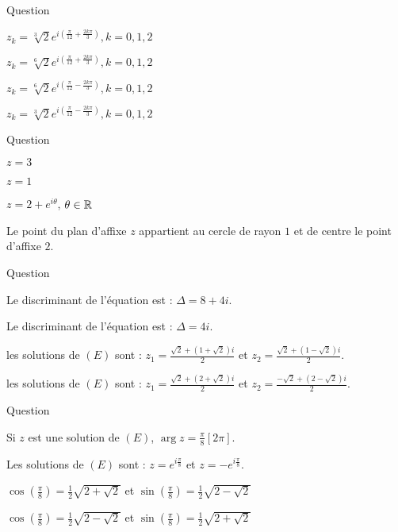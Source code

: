 \begin{multi}[multiple,feedback=
{On résoud l'équation  : \(z^3=1+i= \sqrt 2e^{i\frac{\pi}{4}}\).
}]{Question}
    \item \(z_k=\sqrt[3]{2}e^{i(\frac{\pi}{12}+\frac{2k\pi}{3})}, k=0,1,2\)
    \item* \(z_k=\sqrt[6]{2}e^{i(\frac{\pi}{12}+\frac{2k\pi}{3})}, k=0,1,2\)
    \item* \(z_k=\sqrt[6]{2}e^{i(\frac{\pi}{12}-\frac{2k\pi}{3})}, k=0,1,2\)
    \item \(z_k=\sqrt[3]{2}e^{i(\frac{\pi}{12}-\frac{2k\pi}{3})}, k=0,1,2\)
\end{multi}


\begin{multi}[multiple,feedback=
{\(|z-2|=1\), donc \(z-2=e^{i\theta}\), \(\theta \in \Rr\).
}]{Question}
    \item \(z=3\)
    \item \(z=1\)
    \item* \(z=2+e^{i\theta}\), \(\theta \in \Rr\)
    \item* Le point du plan d'affixe \(z\) appartient au cercle de rayon \(1\) et de centre le point d'affixe \(2\).
\end{multi}


\begin{multi}[multiple,feedback=
{Utiliser la méthode de résolution d'une équation du second degré.
}]{Question}
    \item Le discriminant de l'équation est : \(\Delta = 8+4i\).
    \item* Le discriminant de l'équation est : \(\Delta = 4i\).
    \item les solutions de \((E)\) sont :  \(z_1=\frac{\sqrt 2+ (1+\sqrt 2)i}{2}\) et \(z_2=\frac{\sqrt 2+ (1-\sqrt 2)i}{2}\).
    \item* les solutions de \((E)\) sont : \(z_1=\frac{\sqrt 2+ (2+\sqrt 2)i}{2}\) et \(z_2=\frac{-\sqrt 2+ (2-\sqrt 2)i}{2}\).
\end{multi}


\begin{multi}[multiple,feedback=
{Utiliser l'écriture géométrique et algébrique pour résoudre l'équation et identifier la partie réelle et la partie imaginaire.
}]{Question}
    \item Si \(z\) est une solution de \((E)\), \(\arg z = \frac{\pi}{8} [2\pi]\).
    \item* Les solutions de \((E)\) sont :  \(z=e^{i\frac{\pi}{8}}\) et \(z=-e^{i\frac{\pi}{8}}\).
    \item* \(\cos(\frac{\pi}{8})= \frac{1}{2}\sqrt{2+\sqrt2}\) et
\(\sin(\frac{\pi}{8})= \frac{1}{2}\sqrt{2-\sqrt2}\)
    \item \(\cos(\frac{\pi}{8})= \frac{1}{2}\sqrt{2-\sqrt2}\) et
\(\sin(\frac{\pi}{8})= \frac{1}{2}\sqrt{2+\sqrt2}\)
\end{multi}



